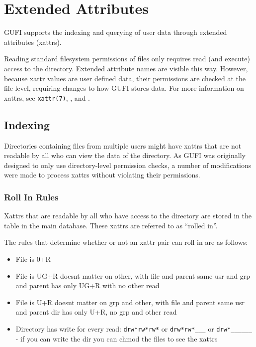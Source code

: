 \section{Extended Attributes}
\label{sec:xattrs}
GUFI supports the indexing and querying of user data through extended
attributes (xattrs).

Reading standard filesystem permissions of files only requires read
(and execute) access to the directory. Extended attribute names are
visible this way. However, because xattr values are user defined data,
their permissions are checked at the file level, requiring changes to
how GUFI stores data. For more information on xattrs, see
\texttt{xattr(7)}, \listxattr, and \getxattr.

\subsection{Indexing}
Directories containing files from multiple users might have xattrs
that are not readable by all who can view the \lstat data of the
directory. As GUFI was originally designed to only use directory-level
permission checks, a number of modifications were made to process
xattrs without violating their permissions.

\subsubsection{Roll In Rules}
Xattrs that are readable by all who have access to the directory are
stored in the \xattrspwd table in the main database. These xattrs are
referred to as ``rolled in''.

The rules that determine whether or not an xattr pair can roll in are
as follows:

\begin{itemize}
\item File is 0+R
\item File is UG+R doesnt matter on other, with file and parent same
  usr and grp and parent has only UG+R with no other read
\item File is U+R doesnt matter on grp and other, with file and parent
  same usr and parent dir has only U+R, no grp and other read
\item Directory has write for every read:
    \texttt{drw*rw*rw*} or \texttt{drw*rw*\_\_\_} or
    \texttt{drw*\_\_\_\_\_\_} - if you can write the dir you can
    chmod the files to see the xattrs
\end{itemize}

